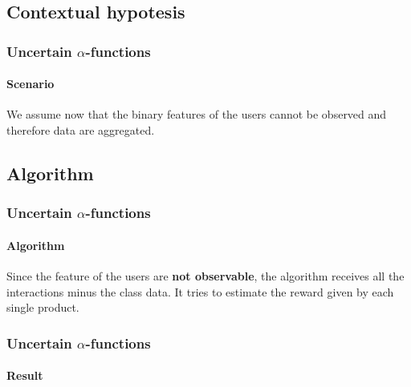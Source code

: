 \documentclass[11pt]{beamer}
\begin{document}

\subsection{Contextual hypotesis}


\begin{frame}

\frametitle{Uncertain $\alpha$-functions}
\framesubtitle{Scenario}

We assume now that the binary features of the users cannot be observed and therefore data are aggregated.

\end{frame}


\subsection{Algorithm}


\begin{frame}
\frametitle{Uncertain $\alpha$-functions}
\framesubtitle{Algorithm}

Since the feature of the users are \textbf{not observable}, the algorithm receives all the interactions minus the class data.
It tries to estimate the reward given by each single product.

\end{frame}


\begin{frame}

\frametitle{Uncertain $\alpha$-functions}
\framesubtitle{Result}

\end{frame}



\end{document}
